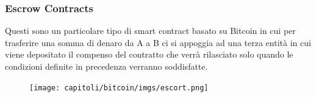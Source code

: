 \subsubsection{Escrow Contracts}

Questi sono un particolare tipo di smart contract basato su Bitcoin in cui per
trasferire una somma di denaro da A a B ci si appoggia ad una terza entità in
cui viene depositato il compenso del contratto che verrà rilasciato solo quando
le condizioni definite in precedenza verranno soddisfatte.

\begin{figure}[H]
    \centering
    \texttt{[image: capitoli/bitcoin/imgs/escort.png]}
\end{figure}